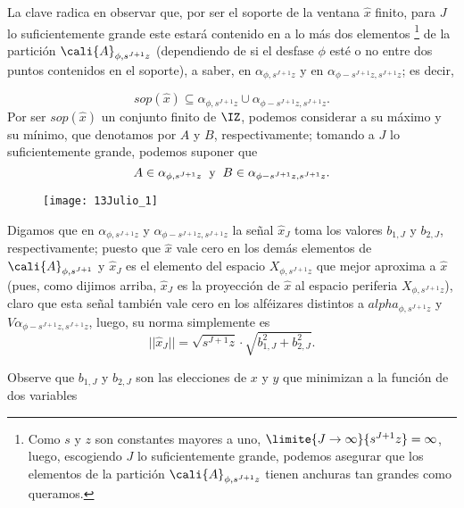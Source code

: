La clave radica en observar que, por ser el soporte de la ventana 
$\hat{x}$
finito, para $J$ lo suficientemente grande este estará contenido
en a lo más dos elementos
\footnote{Como $s$ y $z$ son constantes mayores a uno, 
$\limite{J \rightarrow \infty}{s^{J+1}z}= \infty$,
luego, escogiendo $J$ lo suficientemente grande, podemos
asegurar que los elementos de la partición
$\cali{A}_{\phi,s^{J+1}z}$ tienen anchuras tan grandes como queramos.}
de la partición  $\cali{A}_{\phi,s^{J+1}z}$
(dependiendo de si el desfase $\phi$ esté o no entre
dos puntos contenidos en el soporte),
a saber, en $\alpha_{\phi,s^{J+1}z}$ y en $\alpha_{\phi-s^{J+1}z, s^{J+1}z}$;
es decir,

\[
sop(\hat{x}) \subseteq \alpha_{\phi,s^{J+1}z} \cup 
\alpha_{\phi-s^{J+1}z, s^{J+1}z}.
\]
Por ser $sop(\hat{x})$ un conjunto finito de $\IZ$, podemos considerar
a su máximo y su mínimo, que denotamos por $A$ y $B$, respectivamente;
tomando a $J$ lo suficientemente grande, podemos suponer que
\[
A \in \alpha_{\phi,s^{J+1}z} \hspace{0.2cm} \text{y}
\hspace{0.2cm} B \in \alpha_{\phi-s^{J+1}z, s^{J+1}z}.
\]

\begin{figure}[H]
	\centering
	\texttt{[image: 13Julio\_1]}
	\caption{}
\end{figure}


Digamos que en $\alpha_{\phi,s^{J+1}z}$ y 
$\alpha_{\phi-s^{J+1}z, s^{J+1}z}$ la señal $\hat{x}_{J}$ toma los valores
$b_{1,J}$ y $b_{2,J}$,
respectivamente; puesto que $\hat{x}$ vale cero en los
demás elementos de $\cali{A}_{\phi, s^{J+1}}$ y 
$\hat{x}_{J}$ es el elemento
del espacio $ X_{\phi, s^{J+1}z}$
que mejor aproxima a $\hat{x}$ (pues, como dijimos
arriba, $\hat{x}_{J}$ es la proyección
de $\hat{x}$ al espacio periferia $X_{\phi,s^{J+1}z}$), 
claro que esta señal
también vale cero en los alféizares distintos a 
$alpha_{\phi,s^{J+1}z}$ y $V\alpha_{\phi-s^{J+1}z, s^{J+1}z}$,
luego, su norma simplemente es
\begin{equation} \label{eq 0: 22Agosto}
|| \hat{x}_{J} || = \sqrt{s^{J+1}z} \cdot \sqrt{b_{1, J}^{2} + b_{2, J}^{2}}.
\end{equation}

\noindent
Observe que
$b_{1,J}$ y $b_{2,J}$ son las elecciones de $x$ y $y$
que minimizan a la función de dos variables

